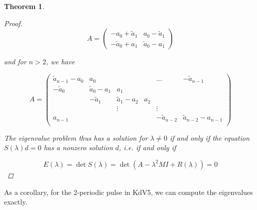 \documentclass[12pt]{article}
\newtheorem{theorem}{Theorem}
\begin{document}
\begin{theorem}
\begin{proof}
\[
A = 
\begin{pmatrix}
-a_0 + \tilde{a}_1 & a_0 - \tilde{a}_1 \\
-\tilde{a}_0 + a_1 & \tilde{a}_0 - a_1
\end{pmatrix}
\]

and for $n > 2$, we have

\[
A = 
\begin{pmatrix}
\tilde{a}_{n-1} - a_0 & a_0 & & & \dots & -\tilde{a}_{n-1}\\
-\tilde{a}_0 & \tilde{a}_0 - a_1 &  a_1 \\
& -\tilde{a}_1 & \tilde{a}_1 - a_2 &  a_2 \\
& & \vdots & & \vdots \\
a_{n-1} & & & & -\tilde{a}_{n-2} & \tilde{a}_{n-2} - a_{n-1} \\
\end{pmatrix}
\]

The eigenvalue problem thus has a solution for $\lambda \neq 0$ if and only if the equation $S(\lambda)d = 0$ has a nonzero solution $d$, i.e. if and only if 

\[
E(\lambda) = \det S(\lambda) = \det(A - \lambda^2 MI + R(\lambda) ) = 0
\]

\end{proof}
\end{theorem}

As a corollary, for the 2-periodic pulse in KdV5, we can compute the eigenvalues exactly.

\end{document}
